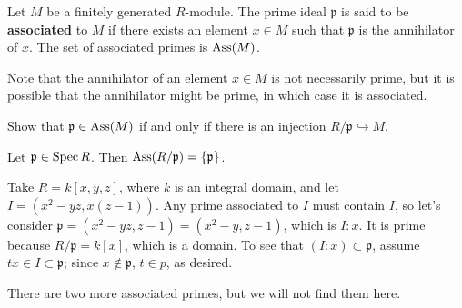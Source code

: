 
\begin{definition} 
Let $M$ be a finitely generated $R$-module.  The prime ideal $\mathfrak{p}$ is said to be
\textbf{associated} to $M$ if there exists an element $x \in M$ such that
$\mathfrak{p}$ is the annihilator of $x$.  The set of associated primes is
$\operatorname{Ass}(M)$.
\end{definition} 

Note that the annihilator of an element $x \in M$ is not necessarily prime, but
it is possible that the annihilator might be prime, in which case it is
associated.

\begin{exercise} 
Show that $\mathfrak{p} \in \operatorname{Ass}(M)$ if and only if there is an injection
$R/\mathfrak{p} \hookrightarrow M$.
\end{exercise} 

\begin{exercise} 
Let $\mathfrak{p} \in \operatorname{Spec} R$. Then $\operatorname{Ass}(R/\mathfrak{p}) =
\left\{\mathfrak{p}\right\}$.
\end{exercise} 

\begin{example}
Take $R=k[x,y,z]$, where $k$ is an integral domain, and let $I = (x^2-yz,x(z-1))$. Any
 prime associated to $I$ must contain $I$, so let's consider
   $\mathfrak{p}=(x^2-yz,z-1)=(x^2-y,z-1)$, which is $I:x$. It is prime because $R/\mathfrak{p} = k[x]$,
   which is a domain. To see that $(I:x)\subset \mathfrak{p}$, assume $tx\in I\subset \mathfrak{p}$; since
   $x\not\in \mathfrak{p}$, $t\in p$, as desired.

   There are two more associated primes, but we will not find them here.
 \end{example}


